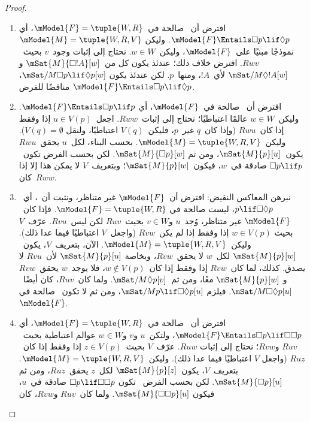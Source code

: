 \documentclass[../../../include/open-logic-section]{subfiles}
\begin{document}
\begin{proof}
  \begin{enumerate}
  \item افترض أن~ صالحة في~$\mModel{F} = \tuple{W, R}$، أي
    $\mModel{F} \Entails \Box p \lif \Diamond p$. وليكن
    $\mModel{M} = \tuple{W, R, V}$ نموذجًا مبنيًا على~$\mModel{F}$،
    وليكن~$w \in W$. نحتاج إلى إثبات وجود~$v$ بحيث~$Rwv$. افترض خلاف
    ذلك؛ عندئذ يكون كل من~$\mSat{M}{\Box !A}[w]$ و
    $\mSat/{M}{\Diamond !A}[w]$ لأي~$!A$، ومنها~$p$. لكن عندئذ يكون
    $\mSat/{M}{\Box p \lif \Diamond p}[w]$، مناقضًا للفرض
    $\mModel{F} \Entails \Box p \lif \Diamond p$.
  \item افترض أن~ صالحة في~$\mModel{F}$، أي
    $\mModel{F} \Entails \Box p \lif p$. وليكن~$w \in W$ عالمًا
    اعتباطيًا؛ نحتاج إلى إثبات~$Rww$. اجعل~$u \in V(p)$ إذا وفقط إذا
    كان~$Rwu$ (وإذا كان~$q$ غير~$p$، فليكن~$V(q)$ اعتباطيًا، ولنقل
    $V(q) = \emptyset$). وليكن~$\mModel{M} = \tuple{W, R, V}$. بحسب
    البناء، لكل~$u$ يحقق~$Rwu$ يكون~$\mSat{M}{p}[u]$، ومن ثم
    $\mSat{M}{\Box p}[w]$. لكن بحسب الفرض تكون~$\Box p \lif p$ صادقة
    في~$w$، فيكون~$\mSat{M}{p}[w]$؛ وبتعريف~$V$ لا يمكن هذا إلا إذا
    كان~$Rww$.
  \item نبرهن المعاكس النقيض: افترض أن~$\mModel{F}$ غير متناظر، ونثبت
    أن~، أي~$p \lif \Box\Diamond p$، ليست صالحة في
    $\mModel{F}= \tuple{W, R}$. فإذا كان~$\mModel{F}$ غير متناظر،
    وُجد~$u$ و$v \in W$ بحيث~$Ruv$ لكن ليس~$Rvu$. عرّف~$V$ بحيث
    $w \in V(p)$ إذا وفقط إذا لم يكن~$Rvw$ (واجعل~$V$ اعتباطيًا فيما
    عدا ذلك). وليكن~$\mModel{M} =\tuple{W, R, V}$. الآن، بتعريف~$V$،
    يكون~$\mSat{M}{p}[w]$ لكل~$w$ لا يحقق~$Rvw$، وبخاصة
    $\mSat{M}{p}[u]$ لأن~$Rvu$ لا يصدق. كذلك، لما كان~$Rvw$ إذا وفقط
    إذا كان~$w \notin V(p)$، فلا يوجد~$w$ يحقق~$Rvw$ و
    $\mSat{M}{p}[w]$ معًا، ومن ثم~$\mSat/{M}{\Diamond p}[v]$. ولما
    كان~$Ruv$، كان أيضًا~$\mSat/{M}{\Box\Diamond p}[u]$. فيلزم
    $\mSat/{M}{p \lif \Box\Diamond p}[u]$، ومن ثم لا تكون~
    صالحة في~$\mModel{F}$.
  \item افترض أن~ صالحة في~$\mModel{F} = \tuple{W,R}$، أي
    $\mModel{F} \Entails \Box p \lif \Box\Box p$، ولتكن~$u$ و$v$
    و$w \in W$ عوالم اعتباطية بحيث~$Ruv$ و$Rvw$؛ نحتاج إلى إثبات
    $Ruw$. عرّف~$V$ بحيث~$z \in V(p)$ إذا وفقط إذا كان~$Ruz$ (واجعل
    $V$ اعتباطيًا فيما عدا ذلك). وليكن~$\mModel{M} =\tuple{W, R, V}$.
    بتعريف~$V$، يكون~$\mSat{M}{p}[z]$ لكل~$z$ يحقق~$Ruz$، ومن ثم
    $\mSat{M}{\Box p}[u]$. لكن بحسب الفرض~ تكون
    $\Box p \lif \Box \Box p$ صادقة في~$u$، فيكون
    $\mSat{M}{\Box \Box p}[u]$. ولما كان~$Ruv$ و$Rvw$، كان

\end{enumerate}
\end{proof}
\end{document}
